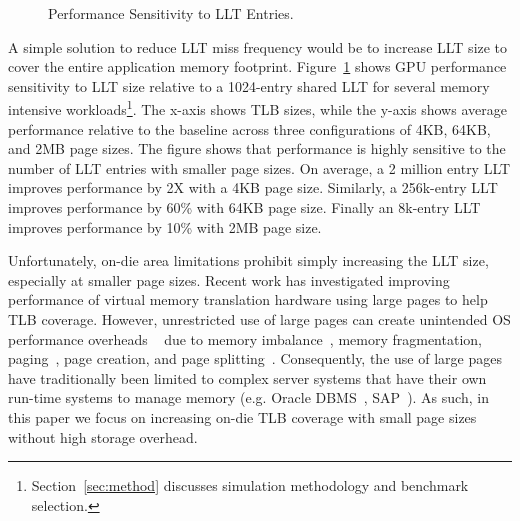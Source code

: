 \begin{figure}[t] 
\vspace{0. in}
\centering
\centerline{}

	\caption{\small Performance Sensitivity to LLT Entries. \normalsize}

\label{fig:tlb_sensitivity} 
\vspace{-0.15 in}
\end{figure}

A simple solution to reduce LLT miss frequency would be to increase
LLT size to cover the entire application memory footprint. Figure~\ref{fig:tlb_sensitivity} shows GPU
performance sensitivity to LLT size relative to a 1024-entry shared
LLT for several
memory intensive workloads\footnote{Section~\ref{sec:method} discusses simulation methodology and benchmark selection.}. The x-axis shows TLB sizes, while the y-axis shows average performance relative to the baseline
across three configurations of 4KB, 64KB, and 2MB page sizes. The figure shows
that performance is highly sensitive to the number of LLT entries with smaller page sizes. On average, a 2 million entry LLT
improves performance by 2X with a 4KB page size. Similarly, a
256k-entry LLT improves performance by 60\% with 64KB page size.
Finally an 8k-entry LLT improves performance by 10\% with 2MB page
size.

Unfortunately, on-die area limitations prohibit simply increasing the
LLT size, especially at smaller page sizes. Recent work has
investigated improving performance of virtual memory translation
hardware using large pages to help TLB coverage.
However, unrestricted use of large pages can create unintended OS
performance overheads ~\cite{SuperPageProblem, TwoPageSize} due to
memory imbalance~\cite{numa-harmful}, memory fragmentation,
paging~\cite{cameo}, page creation, and page
splitting~\cite{largepagevm}. Consequently, the use of large pages
have traditionally been limited to complex server systems that have
their own run-time systems to manage memory (e.g. Oracle
DBMS~\cite{oracle_dbms}, SAP~\cite{sap}). As such, in this paper we
focus on increasing on-die TLB coverage with small page sizes without
high storage overhead.

